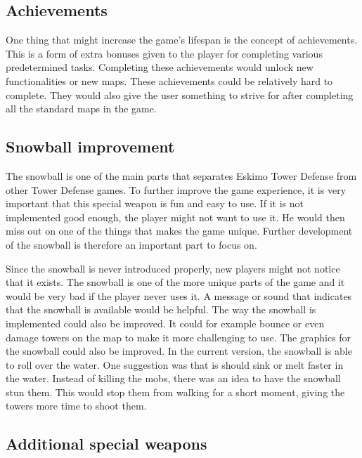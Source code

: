 \subsection{Achievements}

One thing that might increase the game's lifespan is the concept of achievements. This is a form of extra bonuses given to the player for completing various predetermined tasks. Completing these achievements would unlock new functionalities or new maps. These achievements could be relatively hard to complete. They would also give the user something to strive for after completing all the standard maps in the game. 
\subsection{Snowball improvement}

The snowball is one of the main parts that separates Eskimo Tower Defense from other Tower Defense games. To further improve the game experience, it is very important that this special weapon is fun and easy to use. If it is not implemented good enough, the player might not want to use it. He would then miss out on one of the things that makes the game unique. Further development of the snowball is therefore an important part to focus on.

Since the snowball is never introduced properly, new players might not notice that it exists. The snowball is one of the more unique parts of the game and it would be very bad if the player never uses it. A message or sound that indicates that the snowball is available would be helpful. The way the snowball is implemented could also be improved. It could for example bounce or even damage towers on the map to make it more challenging to use. The graphics for the snowball could also be improved. In the current version, the snowball is able to roll over the water. One suggestion was that is should sink or melt faster in the water. Instead of killing the mobs, there was an idea to have the snowball stun them. This would stop them from walking for a short moment, giving the towers more time to shoot them.
\subsection{Additional special weapons}

